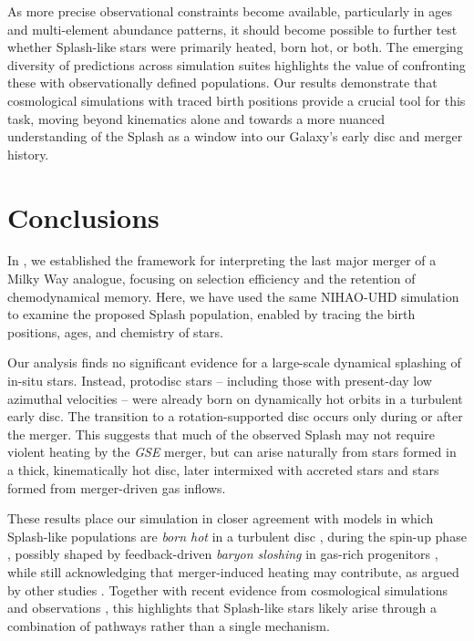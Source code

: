 \documentclass[fleqn,usenatbib]{mnras}
\begin{document}
As more precise observational constraints become available, particularly in ages and multi-element abundance patterns, it should become possible to further test whether Splash-like stars were primarily heated, born hot, or both. The emerging diversity of predictions across simulation suites \citep{Brooks2025} highlights the value of confronting these with observationally defined populations. Our results demonstrate that cosmological simulations with traced birth positions provide a crucial tool for this task, moving beyond kinematics alone and towards a more nuanced understanding of the Splash as a window into our Galaxy's early disc and merger history.

\section{Conclusions}
\label{sec:conclusions}

In , we established the framework for interpreting the last major merger of a Milky Way analogue, focusing on selection efficiency and the retention of chemodynamical memory. Here, we have used the same NIHAO-UHD simulation to examine the proposed Splash population, enabled by tracing the birth positions, ages, and chemistry of stars.

Our analysis finds no significant evidence for a large-scale dynamical splashing of in-situ stars. Instead, protodisc stars -- including those with present-day low azimuthal velocities -- were already born on dynamically hot orbits in a turbulent early disc. The transition to a rotation-supported disc occurs only during or after the merger. This suggests that much of the observed Splash may not require violent heating by the \textit{GSE} merger, but can arise naturally from stars formed in a thick, kinematically hot disc, later intermixed with accreted stars and stars formed from merger-driven gas inflows.

These results place our simulation in closer agreement with models in which Splash-like populations are \emph{born hot} in a turbulent disc \citep[e.g.][]{Amarante2020}, during the spin-up phase \citep[e.g.][]{Yu2023}, possibly shaped by feedback-driven \textit{baryon sloshing} in gas-rich progenitors \citep{BlandHawthorn2025}, while still acknowledging that merger-induced heating may contribute, as argued by other studies \citep[e.g.][]{DiMatteo2019, Belokurov2020, Bonaca2020}. Together with recent evidence from cosmological simulations and observations \citep{Dillamore2022, Dillamore2023, Khoperskov2023, Dillamore2025, Kisku2025}, this highlights that Splash-like stars likely arise through a combination of pathways rather than a single mechanism.
\end{document}
